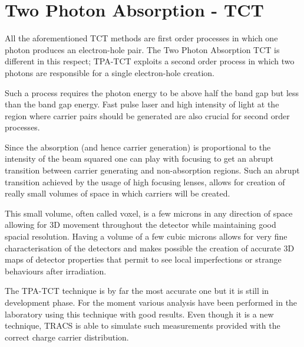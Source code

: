 \section{Two Photon Absorption - TCT} %

All the aforementioned TCT methods are first order processes in which one photon produces an electron-hole pair. The Two Photon Absorption TCT is different in this respect; TPA-TCT exploits a second order process in which two photons are responsible for a single electron-hole creation.


Such a process requires the photon energy to be above half the band gap but less than the band gap energy. Fast pulse laser and high intensity of light at the region where carrier pairs should be generated are also crucial for second order processes.

Since the absorption (and hence carrier generation) is proportional to the intensity of the beam squared one can play with focusing to get an abrupt transition between carrier generating and non-absorption regions. Such an abrupt transition achieved by the usage of high focusing lenses, allows for creation of really small volumes of space in which carriers will be created. 

 This small volume, often called voxel, is a few microns in any direction of space allowing for 3D movement throughout the detector while maintaining good spacial resolution. Having a volume of a few cubic microns allows for very fine characterisation of the detectors and makes possible the creation of accurate 3D maps of detector properties that permit to see local imperfections or strange behaviours after irradiation.

 The TPA-TCT technique is by far the most accurate one but it is still in development phase. For the moment various analysis have been performed in the laboratory using this technique with good results. Even though it is a new technique, TRACS is able to simulate such measurements provided with the correct charge carrier distribution.
